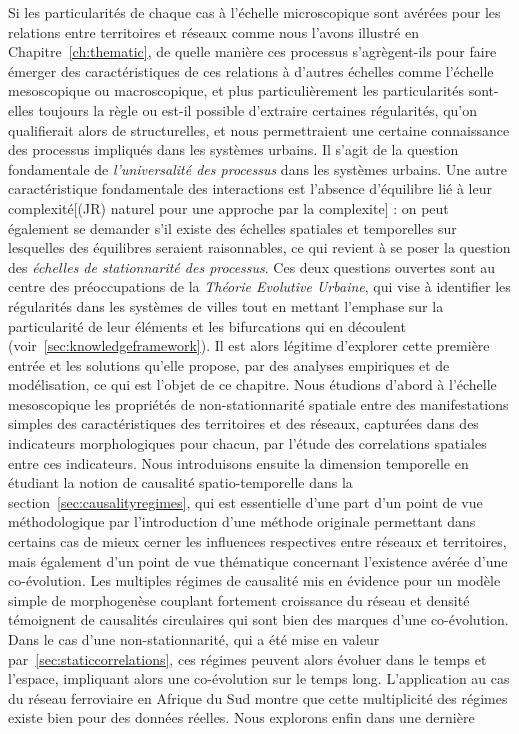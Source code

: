 Si les particularités de chaque cas à l'échelle microscopique sont avérées pour les relations entre territoires et réseaux comme nous l'avons illustré en Chapitre~\ref{ch:thematic}, de quelle manière ces processus s'agrègent-ils pour faire émerger des caractéristiques de ces relations à d'autres échelles comme l'échelle mesoscopique ou macroscopique, et plus particulièrement les particularités sont-elles toujours la règle ou est-il possible d'extraire certaines régularités, qu'on qualifierait alors de structurelles, et nous permettraient une certaine connaissance des processus impliqués dans les systèmes urbains. Il s'agit de la question fondamentale de \emph{l'universalité des processus} dans les systèmes urbains. Une autre caractéristique fondamentale des interactions est l'absence d'équilibre lié à leur complexité[(JR) naturel pour une approche par la complexite] : on peut également se demander s'il existe des échelles spatiales et temporelles sur lesquelles des équilibres seraient raisonnables, ce qui revient à se poser la question des \emph{échelles de stationnarité des processus}. Ces deux questions ouvertes sont au centre des préoccupations de la \emph{Théorie Evolutive Urbaine}, qui vise à identifier les régularités dans les systèmes de villes tout en mettant l'emphase sur la particularité de leur éléments et les bifurcations qui en découlent (voir~\ref{sec:knowledgeframework}). Il est alors légitime d'explorer cette première entrée et les solutions qu'elle propose, par des analyses empiriques et de modélisation, ce qui est l'objet de ce chapitre. Nous étudions d'abord à l'échelle mesoscopique les propriétés de non-stationnarité spatiale entre des manifestations simples des caractéristiques des territoires et des réseaux, capturées dans des indicateurs morphologiques pour chacun, par l'étude des correlations spatiales entre ces indicateurs. Nous introduisons ensuite la dimension temporelle en étudiant la notion de causalité spatio-temporelle dans la section~\ref{sec:causalityregimes}, qui est essentielle d'une part d'un point de vue méthodologique par l'introduction d'une méthode originale permettant dans certains cas de mieux cerner les influences respectives entre réseaux et territoires, mais également d'un point de vue thématique concernant l'existence avérée d'une co-évolution. Les multiples régimes de causalité mis en évidence pour un modèle simple de morphogenèse couplant fortement croissance du réseau et densité témoignent de causalités circulaires qui sont bien des marques d'une co-évolution. Dans le cas d'une non-stationnarité, qui a été mise en valeur par~\ref{sec:staticcorrelations}, ces régimes peuvent alors évoluer dans le temps et l'espace, impliquant alors une co-évolution sur le temps long. L'application au cas du réseau ferroviaire en Afrique du Sud montre que cette multiplicité des régimes existe bien pour des données réelles. Nous explorons enfin dans une dernière 